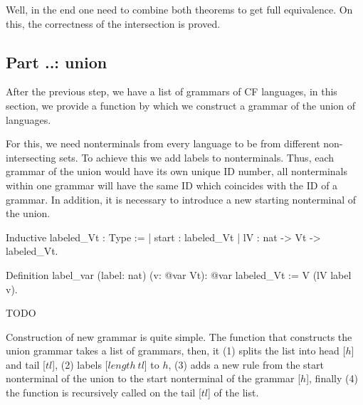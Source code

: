  


Well, in the end one need to combine both theorems to get full equivalence. On this, the correctness of the intersection is proved.

\subsection{Part ..: union}

After the previous step, we have a list of grammars of CF languages, in this section, we provide a function by which we construct a grammar of the union of languages.

For this, we need nonterminals from every language to be from different non-intersecting sets. To achieve this we add labels to nonterminals. Thus, each grammar of the union would have its own unique ID number, all nonterminals within one grammar will have the same ID which coincides with the ID of a grammar. In addition, it is necessary to introduce a new starting nonterminal of the union.

\begin{listing}[h]
    \begin{pyglist}[language=coq, numbers=none, numbersep=5pt]
  Inductive labeled_Vt : Type :=
  | start : labeled_Vt
  | lV : nat -> Vt -> labeled_Vt.
  
  Definition label_var (label: nat) 
                       (v: @var Vt): @var 
                       labeled_Vt :=
    V (lV label v).  
    \end{pyglist}
    \caption{TODO}
    \label{lst:verbments1}
\end{listing}

Construction of new grammar is quite simple. The function that constructs the union grammar takes a list of grammars, then, it (1) splits the list into head [$h$] and tail [$tl$], (2) labels [$length \ tl$] to $h$, (3) adds a new rule from the start nonterminal of the union to the start nonterminal of the grammar [$h$], finally (4) the function is recursively called on the tail [$tl$] of the list.

